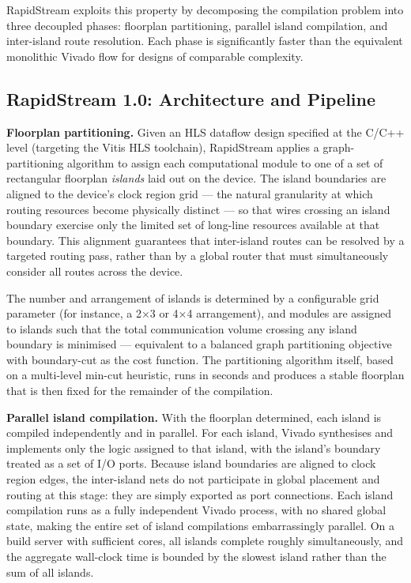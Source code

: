 RapidStream exploits this property by decomposing the compilation problem into three decoupled phases: floorplan partitioning, parallel island compilation, and inter-island route resolution. Each phase is significantly faster than the equivalent monolithic Vivado flow for designs of comparable complexity.

\subsection{RapidStream 1.0: Architecture and Pipeline}

\textbf{Floorplan partitioning.} Given an HLS dataflow design specified at the C/C++ level (targeting the Vitis HLS toolchain), RapidStream applies a graph-partitioning algorithm to assign each computational module to one of a set of rectangular floorplan \textit{islands} laid out on the device. The island boundaries are aligned to the device's clock region grid — the natural granularity at which routing resources become physically distinct — so that wires crossing an island boundary exercise only the limited set of long-line resources available at that boundary. This alignment guarantees that inter-island routes can be resolved by a targeted routing pass, rather than by a global router that must simultaneously consider all routes across the device.

The number and arrangement of islands is determined by a configurable grid parameter (for instance, a 2×3 or 4×4 arrangement), and modules are assigned to islands such that the total communication volume crossing any island boundary is minimised — equivalent to a balanced graph partitioning objective with boundary-cut as the cost function. The partitioning algorithm itself, based on a multi-level min-cut heuristic, runs in seconds and produces a stable floorplan that is then fixed for the remainder of the compilation.

\textbf{Parallel island compilation.} With the floorplan determined, each island is compiled independently and in parallel. For each island, Vivado synthesises and implements only the logic assigned to that island, with the island's boundary treated as a set of I/O ports. Because island boundaries are aligned to clock region edges, the inter-island nets do not participate in global placement and routing at this stage: they are simply exported as port connections. Each island compilation runs as a fully independent Vivado process, with no shared global state, making the entire set of island compilations embarrassingly parallel. On a build server with sufficient cores, all islands complete roughly simultaneously, and the aggregate wall-clock time is bounded by the slowest island rather than the sum of all islands.

